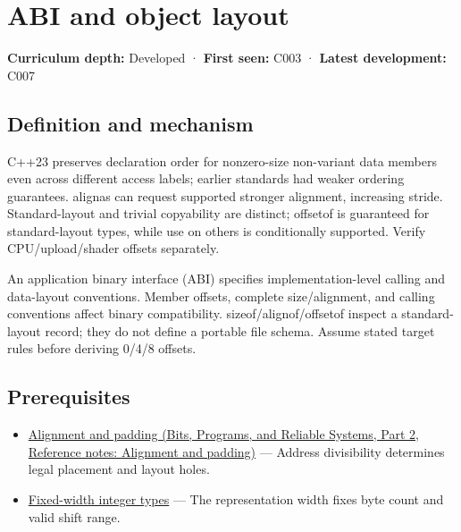 \hypertarget{appendix-c4ac6bb0fff8}{}\label{referencestart:appendix-c4ac6bb0fff8}
\section{ABI and object layout}\label{appendix-c4ac6bb0fff8-abi-and-object-layout}

\hypertarget{appendix-c4ac6bb0fff8-abi-and-object-layout}{}

\textbf{Curriculum depth:} Developed · \textbf{First seen:} C003 · \textbf{Latest development:} C007

\begin{allmightroledefinition}

\subsection{Definition and mechanism}\label{appendix-c4ac6bb0fff8-definition-and-mechanism}

\hypertarget{appendix-c4ac6bb0fff8-definition-and-mechanism}{}

C++23 preserves declaration order for nonzero-size non-variant data members even across different access labels; earlier standards had weaker ordering guarantees. alignas can request supported stronger alignment, increasing stride. Standard-layout and trivial copyability are distinct; offsetof is guaranteed for standard-layout types, while use on others is conditionally supported. Verify CPU/upload/shader offsets separately.

\end{allmightroledefinition}

An application binary interface (ABI) specifies implementation-level calling and data-layout conventions. Member offsets, complete size/alignment, and calling conventions affect binary compatibility. sizeof/alignof/offsetof inspect a standard-layout record; they do not define a portable file schema. Assume stated target rules before deriving 0/4/8 offsets.

\subsection{Prerequisites}\label{appendix-c4ac6bb0fff8-prerequisites}

\hypertarget{appendix-c4ac6bb0fff8-prerequisites}{}

\begin{itemize}
\tightlist
\item
  \href{../01-Bits-Programs-and-Reliable-Systems-P02/main.pdf\#appendix-a1f7c53b4742}{Alignment and padding (Bits, Programs, and Reliable Systems, Part 2, Reference notes: Alignment and padding)} --- Address divisibility determines legal placement and layout holes.
\item
  \hyperref[appendix-cc04044b5782]{Fixed-width integer types} --- The representation width fixes byte count and valid shift range.
\end{itemize}


